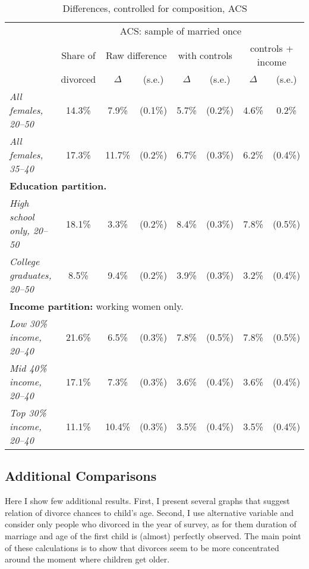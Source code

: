 \documentclass[12pt,letter]{article}
\begin{document}
\begin{table}
\begin{center}
\begin{tabular}{|l|c||c|c|c|c|c|c|}\cline{2-8}
\multicolumn{1}{c|}{} & \multicolumn{7}{c|}{ACS: sample of married once}\\\cline{2-8}
\multicolumn{1}{c|}{} & \small Share of &\multicolumn{2}{c|}{\small Raw difference} & \multicolumn{2}{c|}{\small with controls} & \multicolumn{2}{c|}{\small controls + income} \\ \cline{3-8}
\multicolumn{1}{c|}{} & \small divorced & $\Delta$ & (s.e.) & $\Delta$ & (s.e.) & $\Delta$ & (s.e.) \\  \hline
\textit{All females, 20--50} & 14.3\% &  7.9\% &   (0.1\%) &    5.7\%  &    (0.2\%) &     4.6\%   &   0.2\% \\
\textit{All females, 35--40} &  17.3\% &  11.7\%  &  (0.2\%) &   6.7\% &  (0.3\%) &     6.2\%  &   (0.4\%) \\\hline\hline
\multicolumn{8}{|p{0.9\linewidth}|}{\footnotesize \textbf{Education partition.}}\\\hline
\textit{High school only, 20--50} & 18.1\% &   3.3\%  &    (0.2\%) &   8.4\% &   (0.3\%)   &  7.8\%   &  (0.5\%) \\
\textit{College graduates, 20--50} & 8.5\% &   9.4\% &   (0.2\%) &   3.9\% &   (0.3\%) &   3.2\%   &  (0.4\%) \\\hline\hline
\multicolumn{8}{|p{0.9\linewidth}|}{\footnotesize \textbf{Income partition:} working women only.}\\\hline
\textit{Low 30\% income, 20--40} &  21.6\% &  6.5\% &    (0.3\%) &    7.8\% &  (0.5\%) &   7.8\%   &  (0.5\%) \\
\textit{Mid 40\% income, 20--40} &  17.1\% &  7.3\% &   (0.3\%) &    3.6\%   & (0.4\%) &   3.6\% &    (0.4\%) \\
\textit{Top 30\% income, 20--40} & 11.1\% &  10.4\% &  (0.3\%) &    3.5\% &   (0.4\%) & 3.5\% &  (0.4\%) \\
\hline
\end{tabular}
\caption{Differences, controlled for composition, ACS\label{diff-contr}}
\end{center}
\end{table}
\subsection{Additional Comparisons}

Here I show few additional results. First, I present several graphs that suggest relation of divorce chances to child's age. Second, I use alternative variable and consider only people who divorced in the year of survey, as for them duration of marriage and age of the first child is (almost) perfectly observed. The main point of these calculations is to show that divorces seem to be more concentrated around the moment where children get older.
\end{document}
